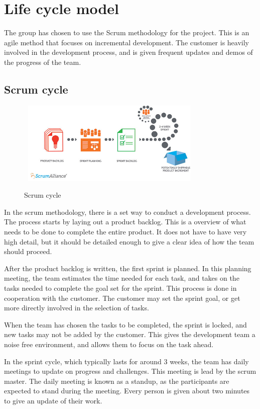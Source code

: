 \documentclass[11pt,a4paper,titlepage,oneside]{report}
\begin{document}
\section{Life cycle model}
The group has chosen to use the Scrum methodology for the project. This is an agile method that focuses on incremental development. The customer is heavily involved in the development process, and is given frequent updates and demos of the progress of the team. 

\subsection{Scrum cycle}
\begin{figure}[h]
\begin{center}
\includegraphics[height=150px,width=340px]{img/Scrum.jpg}
\caption{Scrum cycle}\cite{ScrumCycle}
\label{fig:gantt}
\medskip
\small
\end{center}
\end{figure}

In the scrum methodology, there is a set way to conduct a development process. The process starts by laying out a product backlog. This is a overview of what needs to be done to complete the entire product. It does not have to have very high detail, but it should be detailed enough to give a clear idea of how the team should proceed. 

After the product backlog is written, the first sprint is planned. In this planning meeting, the team estimates the time needed for each task, and takes on the tasks needed to complete the goal set for the sprint. This process is done in cooperation with the customer. The customer may set the sprint goal, or get more directly involved in the selection of tasks. 

When the team has chosen the tasks to be completed, the sprint is locked, and new tasks may not be added by the customer. This gives the development team a noise free environment, and allows them to focus on the task ahead. 

In the sprint cycle, which typically lasts for around 3 weeks, the team has daily meetings to update on progress and challenges. This meeting is lead by the scrum master. The daily meeting is known as a standup, as the participants are expected to stand during the meeting. Every person is given about two minutes to give an update of their work.
\end{document}
